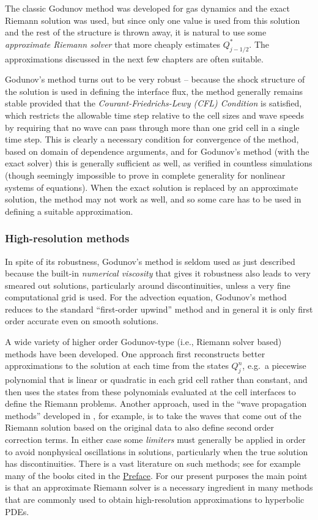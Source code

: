 \documentclass[11pt]{article}
\begin{document}
The classic Godunov method was developed for gas dynamics and the exact
Riemann solution was used, but since only one value is used from this
solution and the rest of the structure is thrown away, it is natural to
use some \emph{approximate Riemann solver} that more cheaply estimates
\(Q_{j-1/2}^*\). The approximations discussed in the next few chapters
are often suitable.

Godunov's method turns out to be very robust -- because the shock
structure of the solution is used in defining the interface flux, the
method generally remains stable provided that the
\emph{Courant-Friedrichs-Lewy (CFL) Condition} is satisfied, which
restricts the allowable time step relative to the cell sizes and wave
speeds by requiring that no wave can pass through more than one grid
cell in a single time step. This is clearly a necessary condition for
convergence of the method, based on domain of dependence arguments, and
for Godunov's method (with the exact solver) this is generally
sufficient as well, as verified in countless simulations (though
seemingly impossible to prove in complete generality for nonlinear
systems of equations). When the exact solution is replaced by an
approximate solution, the method may not work as well, and so some care
has to be used in defining a suitable approximation.

    \hypertarget{high-resolution-methods}{%
\subsubsection{High-resolution methods}\label{high-resolution-methods}}

In spite of its robustness, Godunov's method is seldom used as just
described because the built-in \emph{numerical viscosity} that gives it
robustness also leads to very smeared out solutions, particularly around
discontinuities, unless a very fine computational grid is used. For the
advection equation, Godunov's method reduces to the standard
``first-order upwind'' method and in general it is only first order
accurate even on smooth solutions.

A wide variety of higher order Godunov-type (i.e., Riemann solver based)
methods have been developed. One approach first reconstructs better
approximations to the solution at each time from the states \(Q_j^n\),
e.g.~a piecewise polynomial that is linear or quadratic in each grid
cell rather than constant, and then uses the states from these
polynomials evaluated at the cell interfaces to define the Riemann
problems. Another approach, used in the ``wave propagation methods''
developed in \cite{fvmhp}, for example, is to take the waves that come
out of the Riemann solution based on the original data to also define
second order correction terms. In either case some \emph{limiters} must
generally be applied in order to avoid nonphysical oscillations in
solutions, particularly when the true solution has discontinuities.
There is a vast literature on such methods; see for example many of the
books cited in the \href{Preface.ipynb}{Preface}. For our present
purposes the main point is that an approximate Riemann solver is a
necessary ingredient in many methods that are commonly used to obtain
high-resolution approximations to hyperbolic PDEs.
\end{document}
